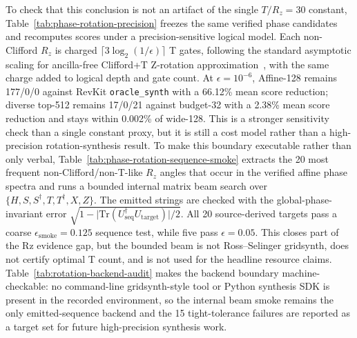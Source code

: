 \documentclass[11pt]{article}
\newcommand{\rz}{\ensuremath{R_z}}
\begin{document}
To check that this conclusion is not an artifact of the single $T/R_z=30$
constant, Table~\ref{tab:phase-rotation-precision} freezes the same verified
phase candidates and recomputes scores under a precision-sensitive logical
model.  Each non-Clifford \rz{} is charged
$\lceil 3\log_2(1/\epsilon)\rceil$ T gates, following the standard asymptotic
scaling for ancilla-free Clifford+T Z-rotation approximation~\cite{ross2016optimalzrotation},
with the same charge added to logical depth and gate count.  At
$\epsilon=10^{-6}$, Affine-128 remains 177/0/0 against RevKit
\texttt{oracle\_synth} with a 66.12\% mean score reduction; diverse top-512
remains 17/0/21 against budget-32 with a 2.38\% mean score reduction and stays
within 0.002\% of wide-128.  This is a stronger sensitivity check than a single
constant proxy, but it is still a cost model rather than a high-precision
rotation-synthesis result.  To make this boundary executable rather than only
verbal, Table~\ref{tab:phase-rotation-sequence-smoke} extracts the 20 most
frequent non-Clifford/non-T-like \rz{} angles that occur in the verified affine phase spectra and
runs a bounded internal matrix beam search over
$\{H,S,S^\dagger,T,T^\dagger,X,Z\}$.  The emitted strings are checked with the
global-phase-invariant error
$\sqrt{1-\lvert\mathrm{Tr}(U_{\mathrm{seq}}^\dagger U_{\mathrm{target}})\rvert/2}$.
All 20 source-derived targets pass a coarse
$\epsilon_{\mathrm{smoke}}=0.125$ sequence test, while five pass
$\epsilon=0.05$.  This closes part of the Rz evidence gap, but the bounded beam
is not Ross--Selinger gridsynth, does not certify optimal T count, and is not
used for the headline resource claims.  Table~\ref{tab:rotation-backend-audit}
makes the backend boundary machine-checkable: no command-line gridsynth-style
tool or Python synthesis SDK is present in the recorded environment, so the
internal beam smoke remains the only emitted-sequence backend and the 15
tight-tolerance failures are reported as a target set for future high-precision
synthesis work.

\begin{table}[H]
\centering
\small
\caption{Affine-FPRM phase-search budget expansion.}
\label{tab:phase-budget}

\end{table}

\begin{table}[H]
\centering
\small
\caption{Exact-scoring budget frontier for learned phase candidate pruning.
Forms/fn. reports shortlisted exact phase-score evaluations per held-out
function relative to the wide-128 search; negative $\Delta$ values favor the
learned shortlist.}
\label{tab:phase-policy-budget-frontier}

\end{table}
\end{document}
